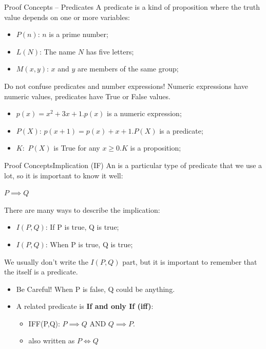 \begin{frame}{Proof Concepts -- Predicates}
  A predicate is a kind of proposition where the truth value depends on one or more variables:\bigskip

  \begin{itemize}
    \item $P(n)$: $n$ is a prime number;
    \item $L(N)$: The name $N$ has five letters;
    \item $M(x,y)$: $x$ and $y$ are members of the same group;
  \end{itemize}\vfill

  \begin{alertblock}{Do not confuse predicates and number expressions!}
    Numeric expressions have numeric values, predicates have True or False values.
    \begin{itemize}
      \item $p(x) = x^2 + 3x + 1$.\hfill $p(x)$ is a numeric expression;
      \item $P(X)$: $p(x+1) = p(x) + x + 1$.\hfill $P(X)$ is a predicate;
      \item $K:$ $P(X)$ is True for any $x \geq 0$.\hfill $K$ is a proposition;
    \end{itemize}
  \end{alertblock}
\end{frame}

\begin{frame}{Proof Concepts}{Implication (IF)}
  An  is a particular type of predicate that we use a lot, so it is important to know it well:
  \begin{center}
    $P \implies Q$
  \end{center}
  There are many ways to describe the implication:
  \begin{itemize}
    \item $I(P,Q)$: If P is true, Q is true;
    \item $I(P,Q)$: When P is true, Q is true;
  \end{itemize}
  We usually don't write the $I(P,Q)$ part, but it is important to remember that the  itself is a predicate.
  \bigskip

  \begin{itemize}
    \item \alert{Be Careful!} When P is false, Q could be anything.
    \item A related predicate is {\bf If and only If (iff)}:
    \begin{itemize}
      \item IFF(P,Q): $P\implies Q$ AND $Q\implies P$.
      \item also written as $P\iff Q$
    \end{itemize}
  \end{itemize}
\end{frame}

